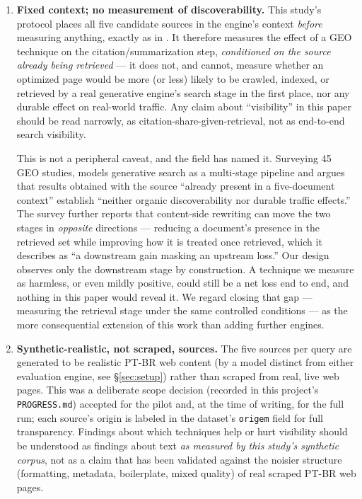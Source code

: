 \documentclass[11pt,a4paper]{article}
\begin{document}
\begin{enumerate}[leftmargin=*]

\item \textbf{Fixed context; no measurement of discoverability.} This
  study's protocol places all five candidate sources in the engine's
  context \emph{before} measuring anything, exactly as in
  \citet{aggarwal2024geo}. It therefore measures the effect of a GEO
  technique on the citation/summarization step, \emph{conditioned on the
  source already being retrieved} --- it does not, and cannot, measure
  whether an optimized page would be more (or less) likely to be crawled,
  indexed, or retrieved by a real generative engine's search stage in the
  first place, nor any durable effect on real-world traffic. Any claim
  about ``visibility'' in this paper should be read narrowly, as
  citation-share-given-retrieval, not as end-to-end search visibility.

  This is not a peripheral caveat, and the field has named it. Surveying 45
  GEO studies, \citet{martinez2026survey} models generative search as a
  multi-stage pipeline and argues that results obtained with the source
  ``already present in a five-document context'' establish ``neither
  organic discoverability nor durable traffic effects.'' The survey further
  reports that content-side rewriting can move the two stages in
  \emph{opposite} directions --- reducing a document's presence in the
  retrieved set while improving how it is treated once retrieved, which it
  describes as ``a downstream gain masking an upstream loss.'' Our design
  observes only the downstream stage by construction. A technique we measure
  as harmless, or even mildly positive, could still be a net loss end to
  end, and nothing in this paper would reveal it. We regard closing that gap
  --- measuring the retrieval stage under the same controlled conditions ---
  as the more consequential extension of this work than adding further
  engines.

\item \textbf{Synthetic-realistic, not scraped, sources.} The five sources
  per query are generated to be realistic PT-BR web content (by a model
  distinct from either evaluation engine, see \S\ref{sec:setup}) rather
  than scraped from real, live web pages. This was a deliberate scope
  decision (recorded in this project's \texttt{PROGRESS.md}) accepted for
  the pilot and, at the time of writing, for the full run; each source's
  origin is labeled in the dataset's \texttt{origem} field for full
  transparency. Findings about which techniques help or hurt visibility
  should be understood as findings about text \emph{as measured by this
  study's synthetic corpus}, not as a claim that has been validated against
  the noisier structure (formatting, metadata, boilerplate, mixed quality)
  of real scraped PT-BR web pages.


\end{enumerate}
\end{document}
